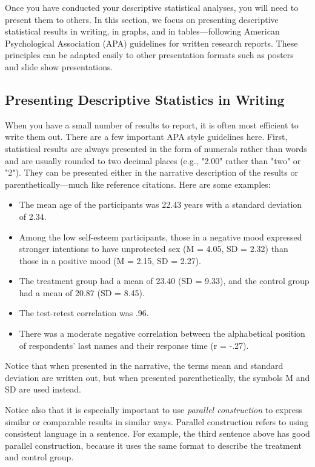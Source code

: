 Once you have conducted your descriptive statistical analyses, you will need to present them to others. In this section, we focus on presenting descriptive statistical results in writing, in graphs, and in tables---following American Psychological Association (APA) guidelines for written research reports. These principles can be adapted easily to other presentation formats such as posters and slide show presentations.


\subsection{Presenting Descriptive Statistics in Writing}

When you have a small number of results to report, it is often most efficient to write them out. There are a few important APA style guidelines here. First, statistical results are always presented in the form of numerals rather than words and are usually rounded to two decimal places (e.g., "2.00" rather than "two" or "2"). They can be presented either in the narrative description of the results or parenthetically---much like reference citations. Here are some examples:

\begin{itemize}
\item The mean age of the participants was 22.43 years with a standard deviation of 2.34.
\item Among the low self-esteem participants, those in a negative mood expressed stronger intentions to have unprotected sex (M = 4.05, SD = 2.32) than those in a positive mood (M = 2.15, SD = 2.27).
\item The treatment group had a mean of 23.40 (SD = 9.33), and the control group had a mean of 20.87 (SD = 8.45).
\item The test-retest correlation was .96.
\item There was a moderate negative correlation between the alphabetical position of respondents' last names and their response time (r = -.27).
\end{itemize}


Notice that when presented in the narrative, the terms mean and standard deviation are written out, but when presented parenthetically, the symbols M and SD are used instead.

Notice also that it is especially important to use \emph{parallel construction} to express similar or comparable results in similar ways. Parallel construction refers to using consistent language in a sentence. For example, the third sentence above has good parallel construction, because it uses the same format to describe the treatment and control group.

